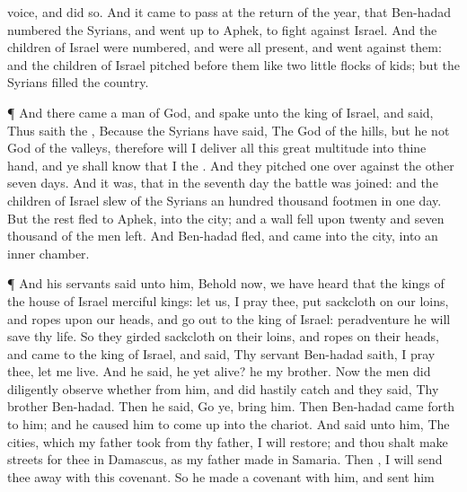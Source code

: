 {voice, and did
so.
And it came to pass at the
return of the
year, that
Ben-hadad
numbered the
Syrians, and went
up to
Aphek, to
fight against
Israel.
And the
children of
Israel were
numbered, and were all
present, and
went
against them: and the
children of
Israel
pitched before them like
two little
flocks of
kids; but the
Syrians
filled the
country.
\par }{\PP {}¶ And there
came a
man of
God, and
spake unto the
king of
Israel, and
said, Thus
saith the
{}, Because the
Syrians have
said, The
{}
{}
God of the
hills, but he
{} not
God of the
valleys, therefore will I
deliver all this
great
multitude into thine
hand, and ye shall
know that I
{} the
{}.
And they
pitched
one over
against the
other
seven
days. And
{} it was, that in the
seventh
day the
battle was
joined: and the
children of
Israel
slew of the
Syrians an
hundred
thousand
footmen in
one
day.
But the
rest
fled to
Aphek, into the
city; and
{} a
wall
fell upon
twenty and
seven
thousand of the
men
{}
left. And
Ben-hadad
fled, and
came into the
city, into an
inner
chamber.
\par }{\PP {}¶ And his
servants
said unto him, Behold now, we have
heard that the
kings of the
house of
Israel
{}
merciful
kings: let us, I pray thee,
put
sackcloth on our
loins, and
ropes upon our
heads, and go
out to the
king of
Israel: peradventure he will
save thy
life.
So they
girded
sackcloth on their
loins, and
{}
ropes on their
heads, and
came to the
king of
Israel, and
said, Thy
servant
Ben-hadad
saith, I pray thee, let me
live. And he
said,
{} he yet
alive? he
{} my
brother.
Now the
men did diligently
observe whether
{} from him, and did
hastily
catch
{} and they
said, Thy
brother
Ben-hadad. Then he
said,
Go ye,
bring him. Then
Ben-hadad came
forth to him; and he caused him to come
up into the
chariot.
And
{}
said unto him, The
cities, which my
father
took from thy
father, I will
restore; and thou shalt
make
streets for thee in
Damascus, as my
father
made in
Samaria. Then
{}, I will send thee
away with this
covenant. So he
made a
covenant with him, and sent him
}
